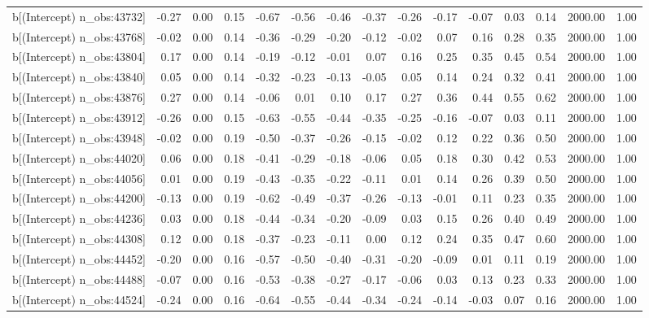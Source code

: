 \begin{table}[ht]
\begin{tabular}{rrrrrrrrrrrrrrr}
  b[(Intercept) n\_obs:43732] & -0.27 & 0.00 & 0.15 & -0.67 & -0.56 & -0.46 & -0.37 & -0.26 & -0.17 & -0.07 & 0.03 & 0.14 & 2000.00 & 1.00 \\ 
  b[(Intercept) n\_obs:43768] & -0.02 & 0.00 & 0.14 & -0.36 & -0.29 & -0.20 & -0.12 & -0.02 & 0.07 & 0.16 & 0.28 & 0.35 & 2000.00 & 1.00 \\ 
  b[(Intercept) n\_obs:43804] & 0.17 & 0.00 & 0.14 & -0.19 & -0.12 & -0.01 & 0.07 & 0.16 & 0.25 & 0.35 & 0.45 & 0.54 & 2000.00 & 1.00 \\ 
  b[(Intercept) n\_obs:43840] & 0.05 & 0.00 & 0.14 & -0.32 & -0.23 & -0.13 & -0.05 & 0.05 & 0.14 & 0.24 & 0.32 & 0.41 & 2000.00 & 1.00 \\ 
  b[(Intercept) n\_obs:43876] & 0.27 & 0.00 & 0.14 & -0.06 & 0.01 & 0.10 & 0.17 & 0.27 & 0.36 & 0.44 & 0.55 & 0.62 & 2000.00 & 1.00 \\ 
  b[(Intercept) n\_obs:43912] & -0.26 & 0.00 & 0.15 & -0.63 & -0.55 & -0.44 & -0.35 & -0.25 & -0.16 & -0.07 & 0.03 & 0.11 & 2000.00 & 1.00 \\ 
  b[(Intercept) n\_obs:43948] & -0.02 & 0.00 & 0.19 & -0.50 & -0.37 & -0.26 & -0.15 & -0.02 & 0.12 & 0.22 & 0.36 & 0.50 & 2000.00 & 1.00 \\ 
  b[(Intercept) n\_obs:44020] & 0.06 & 0.00 & 0.18 & -0.41 & -0.29 & -0.18 & -0.06 & 0.05 & 0.18 & 0.30 & 0.42 & 0.53 & 2000.00 & 1.00 \\ 
  b[(Intercept) n\_obs:44056] & 0.01 & 0.00 & 0.19 & -0.43 & -0.35 & -0.22 & -0.11 & 0.01 & 0.14 & 0.26 & 0.39 & 0.50 & 2000.00 & 1.00 \\ 
  b[(Intercept) n\_obs:44200] & -0.13 & 0.00 & 0.19 & -0.62 & -0.49 & -0.37 & -0.26 & -0.13 & -0.01 & 0.11 & 0.23 & 0.35 & 2000.00 & 1.00 \\ 
  b[(Intercept) n\_obs:44236] & 0.03 & 0.00 & 0.18 & -0.44 & -0.34 & -0.20 & -0.09 & 0.03 & 0.15 & 0.26 & 0.40 & 0.49 & 2000.00 & 1.00 \\ 
  b[(Intercept) n\_obs:44308] & 0.12 & 0.00 & 0.18 & -0.37 & -0.23 & -0.11 & 0.00 & 0.12 & 0.24 & 0.35 & 0.47 & 0.60 & 2000.00 & 1.00 \\ 
  b[(Intercept) n\_obs:44452] & -0.20 & 0.00 & 0.16 & -0.57 & -0.50 & -0.40 & -0.31 & -0.20 & -0.09 & 0.01 & 0.11 & 0.19 & 2000.00 & 1.00 \\ 
  b[(Intercept) n\_obs:44488] & -0.07 & 0.00 & 0.16 & -0.53 & -0.38 & -0.27 & -0.17 & -0.06 & 0.03 & 0.13 & 0.23 & 0.33 & 2000.00 & 1.00 \\ 
  b[(Intercept) n\_obs:44524] & -0.24 & 0.00 & 0.16 & -0.64 & -0.55 & -0.44 & -0.34 & -0.24 & -0.14 & -0.03 & 0.07 & 0.16 & 2000.00 & 1.00 \\ 

\end{tabular}
\end{table}
